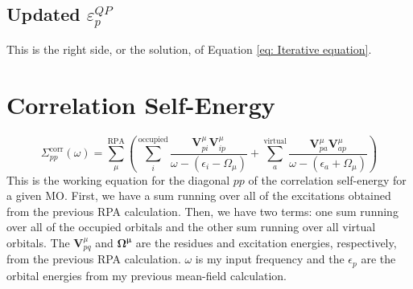 \documentclass[12pt]{caltech_thesis}
\begin{document}
\subsection{Updated $\varepsilon_{p}^{QP}$}
This is the right side, or the solution, of Equation \ref{eq: Iterative equation}.



\section{Correlation Self-Energy}
\label{sec:correlation_self_energy}
\begin{equation}
    \Sigma_{pp}^{\text{corr}}(\omega) = \sum_{\mu }^{\text{RPA}}\left(\sum_{i}^{\text{occupied}} \frac{\textbf{V}_{pi}^{\mu }\textbf{V}_{ip}^{\mu }}{\omega -(\epsilon _{i}-\Omega  _{\mu })}+ \sum_{a}^{\text{virtual}} \frac{\textbf{V}_{pa}^{\mu }\textbf{V}_{ap}^{\mu }}{\omega -(\epsilon _{a}+\Omega  _{\mu })}\right)
\end{equation}
This is the working equation for the diagonal $pp$ of the correlation self-energy for a given MO. First, we have a sum running over all of the excitations obtained from the previous RPA calculation. Then, we have two terms: one sum running over all of the occupied orbitals and the other sum running over all virtual orbitals. The $\textbf{V}^{\mu}_{pq}$ and $\boldsymbol{\Omega ^{\mu}}$ are the residues and excitation energies, respectively, from the previous RPA calculation. $\omega$ is my input frequency and the $\epsilon_p$ are the orbital energies from my previous mean-field calculation.
\end{document}

